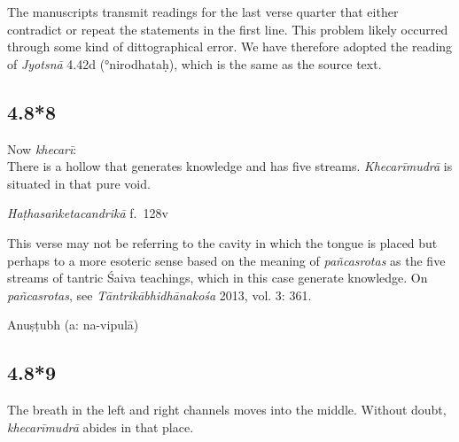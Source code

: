 \begin{ekdosis}
\begin{philcomm}[hp04_008_7]
The manuscripts transmit readings for the last verse quarter that either contradict or repeat the statements in the first line. This problem likely occurred through some kind of dittographical error. We have therefore adopted the reading of \emph{Jyotsnā} 4.42d (°nirodhataḥ), which is the same as the source text. 
\end{philcomm}

\subsection*{4.8*8}
\begin{translation}[hp04_008_8]
Now \emph{khecarī}:\\
There is a hollow that generates knowledge and has five streams. \emph{Khecarīmudrā} is situated in that pure void.
\end{translation}
%

\begin{testimonia}[hp04_008_8]
\emph{Haṭhasaṅketacandrikā} f.~128v
\begin{versinnote}
\end{versinnote}
\end{testimonia}

\begin{philcomm}[hp04_008_8]
This verse may not be referring to the cavity in which the tongue is placed but perhaps to a more esoteric sense based on the meaning of \textit{pañcasrotas} as the five streams of tantric Śaiva teachings, which in this case generate knowledge. On \textit{pañcasrotas}, see \emph{Tāntrikābhidhānakośa} 2013, vol. 3: 361.
\end{philcomm}

\begin{metre}[hp04_008_8]
Anuṣṭubh (a: na-vipulā)
\end{metre}

\subsection*{4.8*9}
\begin{translation}[hp04_008_9]
The breath in the left and right channels moves into the middle. Without doubt, \emph{khecarīmudrā} abides in that place.
\end{translation}


\end{ekdosis}

